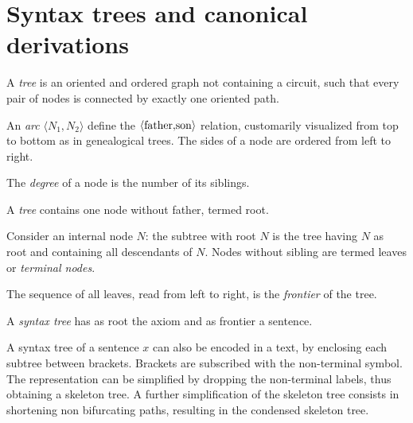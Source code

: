 \section{Syntax trees and canonical derivations}

\begin{definition}
    A \emph{tree} is an oriented and ordered graph not containing a circuit, such that every pair of nodes is connected by exactly one oriented path.
    
    An \emph{arc} $\langle N_1,N_2 \rangle$ define the $\langle \textnormal{father,son} \rangle$ relation, customarily visualized from top to bottom as in genealogical 
    trees. The sides of a node are ordered from left to right. 

    The \emph{degree} of a node is the number of its siblings. 
    
    A \emph{tree} contains one node without father, termed root.

    Consider an internal node $N$: the subtree with root $N$ is the tree having $N$ as root and containing all descendants of $N$. Nodes without sibling are termed leaves or \emph{terminal nodes}. 

    The sequence of all leaves, read from left to right, is the \emph{frontier} of the tree.

    A \emph{syntax tree} has as root the axiom and as frontier a sentence.
\end{definition}
A syntax tree of a sentence $x$ can also be encoded in a text, by enclosing each subtree between brackets. Brackets are subscribed with the non-terminal symbol. The representation can be simplified 
by dropping the non-terminal labels, thus obtaining a skeleton tree. A further simplification of the skeleton tree consists in shortening non bifurcating paths, resulting in the condensed skeleton tree. 